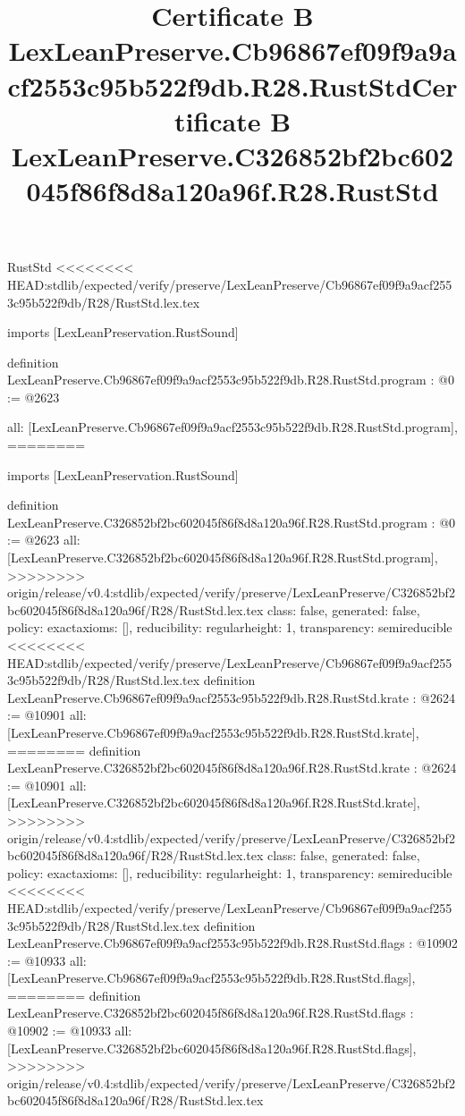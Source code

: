 \begin{lexlean}{RustStd}
<<<<<<<< HEAD:stdlib/expected/verify/preserve/LexLeanPreserve/Cb96867ef09f9a9acf2553c95b522f9db/R28/RustStd.lex.tex
\title{Certificate B LexLeanPreserve.Cb96867ef09f9a9acf2553c95b522f9db.R28.RustStd}
\begin{coremodule}
imports [LexLeanPreservation.RustSound]

definition LexLeanPreserve.Cb96867ef09f9a9acf2553c95b522f9db.R28.RustStd.program : @0 := @2623 {
  all: [LexLeanPreserve.Cb96867ef09f9a9acf2553c95b522f9db.R28.RustStd.program],
========
\title{Certificate B LexLeanPreserve.C326852bf2bc602045f86f8d8a120a96f.R28.RustStd}
\begin{coremodule}
imports [LexLeanPreservation.RustSound]

definition LexLeanPreserve.C326852bf2bc602045f86f8d8a120a96f.R28.RustStd.program : @0 := @2623 {
  all: [LexLeanPreserve.C326852bf2bc602045f86f8d8a120a96f.R28.RustStd.program],
>>>>>>>> origin/release/v0.4:stdlib/expected/verify/preserve/LexLeanPreserve/C326852bf2bc602045f86f8d8a120a96f/R28/RustStd.lex.tex
  class: false,
  generated: false,
  policy: exact{axioms: []},
  reducibility: regular{height: 1},
  transparency: semireducible
}
<<<<<<<< HEAD:stdlib/expected/verify/preserve/LexLeanPreserve/Cb96867ef09f9a9acf2553c95b522f9db/R28/RustStd.lex.tex
definition LexLeanPreserve.Cb96867ef09f9a9acf2553c95b522f9db.R28.RustStd.krate : @2624 := @10901 {
  all: [LexLeanPreserve.Cb96867ef09f9a9acf2553c95b522f9db.R28.RustStd.krate],
========
definition LexLeanPreserve.C326852bf2bc602045f86f8d8a120a96f.R28.RustStd.krate : @2624 := @10901 {
  all: [LexLeanPreserve.C326852bf2bc602045f86f8d8a120a96f.R28.RustStd.krate],
>>>>>>>> origin/release/v0.4:stdlib/expected/verify/preserve/LexLeanPreserve/C326852bf2bc602045f86f8d8a120a96f/R28/RustStd.lex.tex
  class: false,
  generated: false,
  policy: exact{axioms: []},
  reducibility: regular{height: 1},
  transparency: semireducible
}
<<<<<<<< HEAD:stdlib/expected/verify/preserve/LexLeanPreserve/Cb96867ef09f9a9acf2553c95b522f9db/R28/RustStd.lex.tex
definition LexLeanPreserve.Cb96867ef09f9a9acf2553c95b522f9db.R28.RustStd.flags : @10902 := @10933 {
  all: [LexLeanPreserve.Cb96867ef09f9a9acf2553c95b522f9db.R28.RustStd.flags],
========
definition LexLeanPreserve.C326852bf2bc602045f86f8d8a120a96f.R28.RustStd.flags : @10902 := @10933 {
  all: [LexLeanPreserve.C326852bf2bc602045f86f8d8a120a96f.R28.RustStd.flags],
>>>>>>>> origin/release/v0.4:stdlib/expected/verify/preserve/LexLeanPreserve/C326852bf2bc602045f86f8d8a120a96f/R28/RustStd.lex.tex
}}}
\end{coremodule}}
\end{coremodule}
\end{lexlean}
